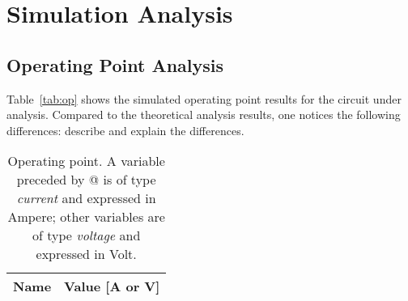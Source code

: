 \section{Simulation Analysis}
\label{sec:simulation}

\subsection{Operating Point Analysis}

Table~\ref{tab:op} shows the simulated operating point results for the circuit
under analysis. Compared to the theoretical analysis results, one notices the
following differences: describe and explain the differences.

\begin{table}[h]
  \centering
  \begin{tabular}{|l|r|}
    \hline
    {\bf Name} & {\bf Value [A or V]} \\ \hline
    
  \end{tabular}
  \caption{Operating point. A variable preceded by @ is of type {\em current}
    and expressed in Ampere; other variables are of type {\it voltage} and expressed in
    Volt.}
  \label{tab:op_spice}
\end{table}






